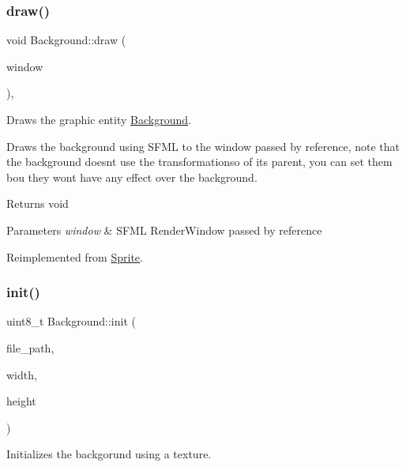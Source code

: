 \subsubsection{\texorpdfstring{draw()}{draw()}}
{\footnotesize\ttfamily void Background\+::draw (\begin{DoxyParamCaption}\item[{sf\+::\+Render\+Window \&}]{window }\end{DoxyParamCaption})\hspace{0.3cm}{\ttfamily [override]}, {\ttfamily [virtual]}}



Draws the graphic entity \hyperlink{class_background}{Background}. 

Draws the background using S\+F\+ML to the window passed by reference, note that the background doesn\textquotesingle{}t use the transformationso of it\textquotesingle{}s parent, you can set them bou they won\textquotesingle{}t have any effect over the background.

\begin{DoxyReturn}{Returns}
void 
\end{DoxyReturn}

\begin{DoxyParams}{Parameters}
{\em window} & S\+F\+ML Render\+Window passed by reference \\
\hline
\end{DoxyParams}


Reimplemented from \hyperlink{class_sprite_a067dfc27f53ce4d983db29407be1c11e}{Sprite}.

\mbox{\label{class_background_ae4ae960cd876ef4a2f9fb6e0a7e8bc73}} 
\subsubsection{\texorpdfstring{init()}{init()}}
{\footnotesize\ttfamily uint8\+\_\+t Background\+::init (\begin{DoxyParamCaption}\item[{const std\+::string \&}]{file\+\_\+path,  }\item[{const uint32\+\_\+t}]{width,  }\item[{const uint32\+\_\+t}]{height }\end{DoxyParamCaption})}



Initializes the backgorund using a texture. 

